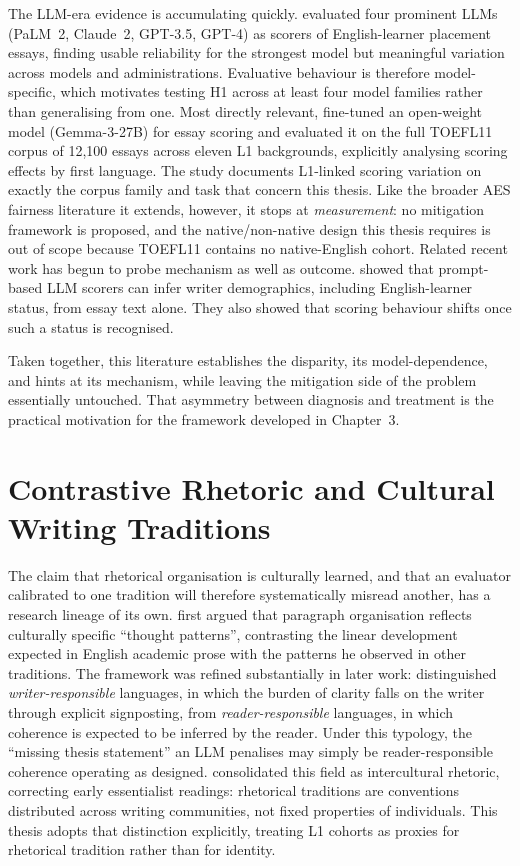The LLM-era evidence is accumulating quickly.
\citet{pack2024llm} evaluated four prominent LLMs (PaLM~2, Claude~2,
GPT-3.5, GPT-4) as scorers of English-learner placement essays,
finding usable reliability for the strongest model but meaningful
variation across models and administrations. Evaluative behaviour is
therefore model-specific, which motivates testing H1
across at least four model families rather than generalising from one.
Most directly relevant, \citet{gayed2026firstlanguage} fine-tuned an
open-weight model (Gemma-3-27B) for essay scoring and evaluated it on
the full TOEFL11 corpus of 12{,}100 essays across eleven L1
backgrounds, explicitly analysing scoring effects by first language.
The study documents L1-linked scoring variation on exactly the corpus
family and task that concern this thesis. Like the broader AES
fairness literature it extends, however, it stops at \emph{measurement}: no
mitigation framework is proposed, and the native/non-native design
this thesis requires is out of scope because TOEFL11 contains no
native-English cohort. Related recent work has begun to probe
mechanism as well as outcome. \citet{yang2025demographics} showed that
prompt-based LLM scorers can infer writer demographics, including
English-learner status, from essay text alone. They also showed that
scoring behaviour shifts once such a status is recognised.

Taken together, this literature establishes the disparity, its
model-dependence, and hints at its mechanism, while leaving the
mitigation side of the problem essentially untouched. That asymmetry
between diagnosis and treatment is the practical motivation for the
framework developed in Chapter~3.

\section{Contrastive Rhetoric and Cultural Writing Traditions}
\label{sec:lit-rhetoric}

The claim that rhetorical organisation is culturally learned, and
that an evaluator calibrated to one tradition will therefore
systematically misread another, has a research lineage of its own.
\citet{kaplan1966cultural} first argued that paragraph organisation
reflects culturally specific ``thought patterns'', contrasting the
linear development expected in English academic prose with the
patterns he observed in other traditions. The framework was refined
substantially in later work: \citet{hinds1987reader} distinguished
\emph{writer-responsible} languages, in which the burden of clarity
falls on the writer through explicit signposting, from
\emph{reader-responsible} languages, in which coherence is expected to
be inferred by the reader. Under this typology, the ``missing
thesis statement'' an LLM penalises may simply be reader-responsible
coherence operating as designed. \citet{connor2011intercultural}
consolidated this field as intercultural rhetoric, correcting early
essentialist readings: rhetorical traditions are conventions
distributed across writing communities, not fixed properties of
individuals. This thesis adopts that distinction explicitly, treating
L1 cohorts as proxies for rhetorical tradition rather than for
identity.

